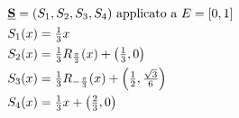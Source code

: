 \documentclass[preview]{standalone}
\begin{document}
\begin{align*}
& \textbf{\underline{S}} = (S_1,S_2,S_3,S_4) \ \text{applicato a} \ E = [0,1] \\ & S_1(x)=\textstyle\frac{1}{3}x \\ & S_2(x)=\textstyle\frac{1}{3}R_{\frac{\pi}{3}}(x) + \left(\textstyle\frac{1}{3},0\right) \\ & S_3(x)=\textstyle\frac{1}{3}R_{-\frac{\pi}{3}}(x) + \left(\textstyle\frac{1}{2},\textstyle\frac{\sqrt{3}}{6}\right) \\ & S_4(x)=\textstyle\frac{1}{3}x + \left(\textstyle\frac{2}{3},0\right)
\end{align*}
\end{document}
